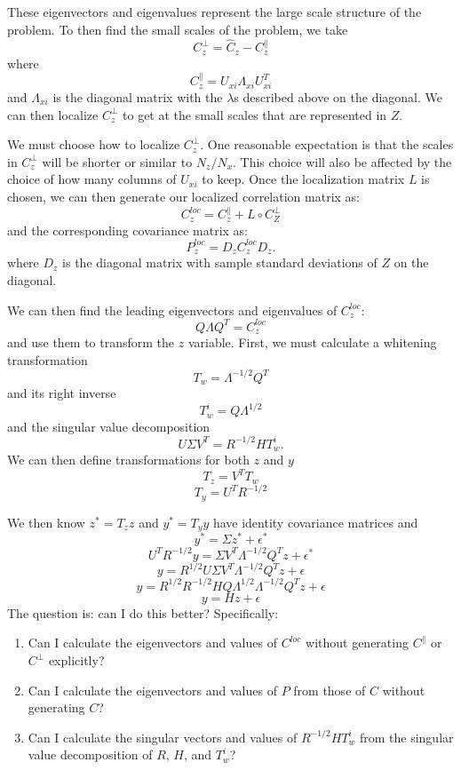 \documentclass[11pt]{article} %
\begin{document}
These eigenvectors and eigenvalues represent the large scale structure of the problem.
To then find the small scales of the problem, we take
\[
C_z^\bot = \hat{C}_z - C_z^\parallel
\]
where
\[
C_z^\parallel = U_{xi} \Lambda_{xi}  U_{xi}^T
\]
and $\Lambda_{xi}$ is the diagonal matrix with the $\lambda$s described above on the diagonal.
We can then localize $C_z^\bot$ to get at the small scales that are represented in $Z$.

We must choose how to localize $C_z^\bot$.
One reasonable expectation is that the scales in $C_z^\bot$ will be shorter or similar to $N_z/N_x$.
This choice will also be affected by the choice of how many columns of $U_{xi}$ to keep.
Once the localization matrix $L$ is chosen, we can then generate our localized correlation matrix as:
\[
C_z^{loc} = C_z^\parallel + L \circ C_Z^\bot
\]
and the corresponding covariance matrix as:
\[
P_z^{loc} = D_z C_z^{loc} D_z.
\]
where $D_z$ is the diagonal matrix with sample standard deviations of $Z$ on the diagonal.

We can then find the leading eigenvectors and eigenvalues of $C_z^{loc}$:
\[
Q \Lambda Q^T = C_z^{loc}
\]
and use them to transform the $z$ variable.
First, we must calculate a whitening transformation
\[
T_w = \Lambda^{-1/2} Q^T
\]
and its right inverse
\[
T_w^i = Q \Lambda^{1/2}
\]
and the singular value decomposition
\[
U \Sigma V^T = R^{-1/2} H T_w^i.
\]
We can then define transformations for both $z$ and $y$
\[
T_z = V^T T_w
\]
\[
T_y = U^T R^{-1/2}
\]

We then know $z^* = T_z z$ and $y^* = T_y y$ have identity covariance matrices and
\[
y^* = \Sigma z^* + \epsilon^*
\]
\[
U^T R^{-1/2} y = \Sigma V^T \Lambda^{-1/2} Q^T z + \epsilon^*
\]
\[
y = R^{1/2} U \Sigma V^T \Lambda^{-1/2} Q^T z  + \epsilon
\]
\[
y = R^{1/2}R^{-1/2} H Q \Lambda^{1/2} \Lambda^{-1/2} Q^T z  + \epsilon
\]
\[
y = H z  + \epsilon
\]
The question is: can I do this better?
Specifically:
\begin{enumerate}
\item Can I calculate the eigenvectors and values of $C^{loc}$ without generating $C^\parallel$ or $C^\bot$ explicitly?
\item Can I calculate the eigenvectors and values of $P$ from those of $C$ without generating $C$?
\item Can I calculate the singular vectors and values of $R^{-1/2} H T_w^i$ from the singular value decomposition of $R$, $H$, and $T_w^i$?
\end{enumerate}
\end{document}

